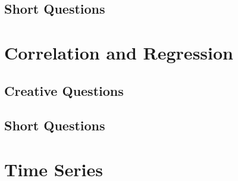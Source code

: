 \documentclass[a4paper,oneside]{book}
\begin{document}
\section{Short Questions}

\chapter{Correlation and Regression} 
\section{Creative Questions}
\section{Short Questions}

\chapter{Time Series} 
\end{document}
